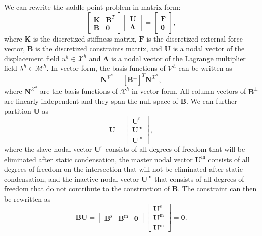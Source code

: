 We can rewrite the saddle point problem in matrix form:
\begin{equation}\label{eq:disc-LM-form-chapter4}
	\begin{bmatrix}
		\mathbf{K} & \mathbf{B}^T \\
		\mathbf{B} & \mathbf{0}
	\end{bmatrix}\begin{bmatrix}
		\mathbf{U} \\
		\mathbf{\Lambda}
	\end{bmatrix}
	=
	\begin{bmatrix}
		\mathbf{F} \\
		\mathbf{0}
	\end{bmatrix},
\end{equation}
where $\mathbf{K}$ is the discretized stiffness matrix, $\mathbf{F}$ is the discretized external force vector, $\mathbf{B}$ is the discretized constraints matrix, and $\mathbf{U}$ is a nodal vector of the displacement field $u^h \in \mathcal{X}^h$ and $\mathbf{\Lambda}$ is a nodal vector of the Lagrange multiplier field $\lambda^h \in \mathcal{M}^h$. In vector form, the basis functions of $\mathcal{V}^h$ can be written as
\begin{equation}
	\mathbf{N}^{\mathcal{V}^h} = \left[\mathbf{B}^\perp\right]^T\mathbf{N}^{\mathcal{X}^h},
\end{equation}
where $\mathbf{N}^{\mathcal{X}^h}$ are the basis functions of $\mathcal{X}^h$ in vector form. All column vectors of $\mathbf{B}^\perp$ are linearly independent and they span the null space of $\mathbf{B}$. We can further partition $\mathbf{U}$ as
\begin{equation}
	\mathbf{U}=\begin{bmatrix}
		\mathbf{U}^\text{s} \\
		\mathbf{U}^\text{m} \\
		\mathbf{U}^\text{in}
	\end{bmatrix},
\end{equation}
where the slave nodal vector $\mathbf{U}^\text{s}$ consists of all degrees of freedom that will be eliminated after static condensation, the master nodal vector $\mathbf{U}^\text{m}$ consists of all degrees of freedom on the intersection that will not be eliminated after static condensation, and the inactive nodal vector $\mathbf{U}^\text{in}$ that consists of all degrees of freedom that do not contribute to the construction of $\mathbf{B}$. The constraint can then be rewritten as
\begin{equation}
	\mathbf{B}\mathbf{U}=
	\begin{bmatrix}
		\mathbf{B}^\text{s} & \mathbf{B}^\text{m} & \mathbf{0}
	\end{bmatrix}\begin{bmatrix}
		\mathbf{U}^\text{s} \\
		\mathbf{U}^\text{m} \\
		\mathbf{U}^\text{in}
	\end{bmatrix}=\mathbf{0}.\label{eq:constraint-form-chapter4}
\end{equation}
